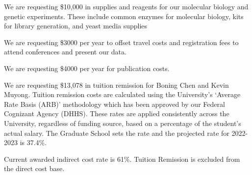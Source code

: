  We are requesting \$10,000 in supplies and reagents for our molecular biology and genetic experiments.  These include common enzymes for molecular biology, kits for library generation, and yeast media supplies

  We are requesting \$3000 per year to offset travel costs and registration fees to attend conferences and present our data.

  We are requesting \$4000 per year for publication costs. 

We are requesting \$13,078 in tuition remission for Boning Chen and Kevin Muyong. Tuition remission costs are calculated using the University's `Average Rate Basis (ARB)' methodology which has been approved by our Federal Cognizant Agency (DHHS). These rates are applied consistently across the University, regardless of funding source, based on a percentage of the student's actual salary. The Graduate School sets the rate and the projected rate for 2022-2023 is 37.4\%. 

Current awarded indirect cost rate is 61\%. Tuition Remission is excluded from the direct cost base.


